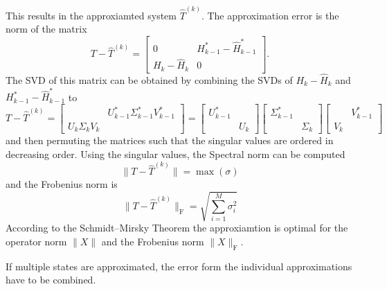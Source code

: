 \documentclass[doctype=mastersthesis,BCOR=15mm,biblatex]{ldvbook}%
\newcommand{\R}{\mathcal{R}} %
\newcommand{\Ob}{\mathcal{O}} %
\begin{document}
This results in the approxiamted system $\hat{T}^{(k)}$.
The approximation error is the norm of the matrix
\begin{equation}
	T-\hat{T}^{(k)} = 
	\begin{bmatrix}
	0&H^*_{k-1}-\hat{H}^*_{k-1}\\
	H_k-\hat{H}_k&0
	\end{bmatrix}.
\end{equation}
The SVD of this matrix can be obtained by combining the SVDs of $H_k-\hat{H}_k$ and $H^*_{k-1}-\hat{H}^*_{k-1}$ to
\begin{equation}
T-\hat{T}^{(k)}=
	\begin{bmatrix}
	 & U_{k-1}^*\Sigma_{k-1}^* V_{k-1}^*\\
	 U_k\Sigma_k V_k
	\end{bmatrix}
	=
	\begin{bmatrix}
	U_{k-1}^*\\
	&U_k
	\end{bmatrix}
	\begin{bmatrix}
\Sigma_{k-1}^*\\
&\Sigma_{k}
\end{bmatrix}
	\begin{bmatrix}
&V_{k-1}^*\\
V_{k}
\end{bmatrix}
\end{equation}
and then permuting the matrices such that the singular values are ordered in decreasing order.
Using the singular values, the Spectral norm can be computed 
\begin{equation}\label{eq:bound_single}
	\|T-\hat{T}^{(k)}\| = \max(\sigma)
\end{equation}
and the Frobenius norm is
\begin{equation}
	\|T-\hat{T}^{(k)}\|_\text{F} = \sqrt{\sum_{i=1}^{M}\sigma_i^2}
\end{equation}
According to the Schmidt–Mirsky Theorem \cite{bai_matrix_2021} the approxiamtion is optimal for the operator norm $\|X\|$ and the Frobenius norm $\|X\|_\text{F}$.

If multiple states are approximated, the error form the individual approximations have to be combined.
\end{document}
